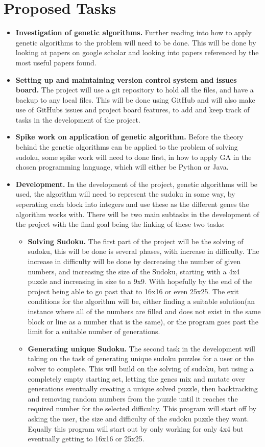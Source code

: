 \documentclass[a4paper,10pt]{article}
\begin{document}
\section*{Proposed Tasks}
\begin{itemize}
	\item \textbf{Investigation of genetic algorithms.} Further reading into how to apply genetic algorithms to the problem will need to be done. This will be done by looking at papers on google scholar and looking into papers referenced by the most useful papers found.
	\item \textbf{Setting up and maintaining version control system and issues board.} The project will use a git repository to hold all the files, and have a backup to any local files. This will be done using GitHub and will also make use of GitHubs issues and project board features, to add and keep track of tasks in the development of the project. 
	\item \textbf{Spike work on application of genetic algorithm.} Before the theory behind the genetic algorithms can be applied to the problem of solving sudoku, some spike work will need to done first, in how to apply GA in the chosen programming language, which will either be Python or Java.
	\item \textbf{Development.} In the development of the project, genetic algorithms will be used, the algorithm will need to represent the sudoku in some way, by seperating each block into integers and use these as the different genes the algorithm works with. There will be two main subtasks in the development of the project with the final goal being the linking of these two tasks:
	\begin{itemize}
		\item \textbf{Solving Sudoku.} The first part of the project will be the solving of sudoku, this will be done is several phases, with increase in difficulty. The increase in difficulty will be done by decreasing the number of given numbers, and increasing the size of the Sudoku, starting with a 4x4 puzzle and increasing in size to a 9x9. With hopefully by the end of the project being able to go past that to 16x16 or even 25x25. The exit conditions for the algorithm will be, either finding a suitable solution(an instance where all of the numbers are filled and does not exist in the same block or line as a number that is the same), or the program goes past the limit for a suitable number of generations.
		\item \textbf{Generating unique Sudoku.} The second task in the development will taking on the task of generating unique sudoku puzzles for a user or the solver to complete. This will build on the solving of sudoku, but using a completely empty starting set, letting the genes mix and mutate over generations eventually creating a unique solved puzzle, then backtracking and removing random numbers from the puzzle until it reaches the required number for the selected difficulty. This program will start off by asking the user, the size and difficulty of the sudoku puzzle they want. Equally this program will start out by only working for only 4x4 but eventually getting to 16x16 or 25x25. 

\end{itemize}
\end{itemize}
\end{document}
